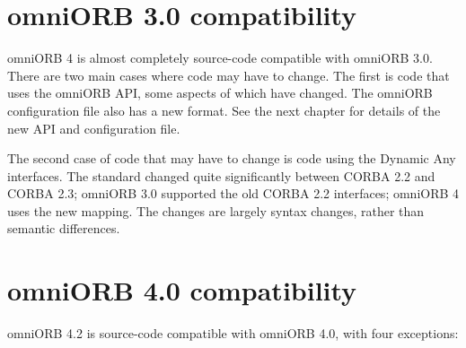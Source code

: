 \documentclass[11pt,twoside,a4paper]{book}
\begin{document}
\section{omniORB 3.0 compatibility}

omniORB 4 is almost completely source-code compatible with omniORB
3.0. There are two main cases where code may have to change. The first
is code that uses the omniORB API, some aspects of which have
changed. The omniORB configuration file also has a new format. See the
next chapter for details of the new API and configuration file.

The second case of code that may have to change is code using the
Dynamic Any interfaces. The standard changed quite significantly
between CORBA 2.2 and CORBA 2.3; omniORB 3.0 supported the old CORBA
2.2 interfaces; omniORB 4 uses the new mapping. The changes are
largely syntax changes, rather than semantic differences.


\section{omniORB 4.0 compatibility}

omniORB 4.2 is source-code compatible with omniORB 4.0, with four
exceptions:
\end{document}
